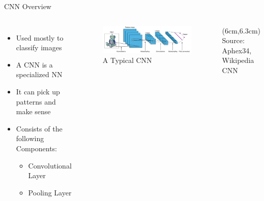\documentclass[citestyle=authoryear,bibstyle=numeric,hyperref,backend=biber]{sdqbeamer}
\begin{document}
\begin{frame}{CNN Overview}
    \begin{columns}
        \begin{itemize}
            \item Used mostly to classify images
            \item A CNN is a specialized NN
            \item It can pick up patterns and make sense 
            \item Consists of the following Components:
            \begin{itemize}
                \item Convolutional Layer 
                \item Pooling Layer
            \end{itemize}
        \end{itemize}

        \begin{figure}
            \centering
            \includegraphics[width=1\textwidth]{pictures/typical_cnn.png}
            \caption{A Typical CNN}
            \label{fig:typical-CNN}
        \end{figure}
         \begin{textblock*}{6cm}(6cm,6.3cm) %
             \tiny{Source: Aphex34, Wikipedia CNN}
        \end{textblock*}

        
    \end{columns}
\end{frame}
\end{document}
